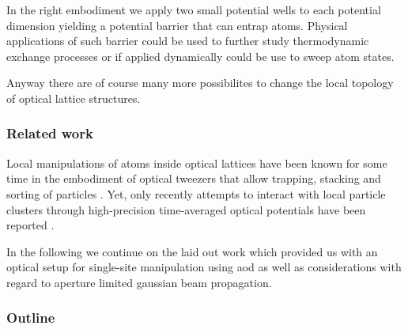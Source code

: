 In the right embodiment we apply two small potential wells to each potential
dimension yielding a potential barrier that can entrap atoms. Physical
applications of such barrier could be used to further study thermodynamic
exchange processes or if applied dynamically could be use to sweep atom
states.

Anyway there are of course many more possibilites to change the local
topology of optical lattice structures.

\subsubsection{Related work}

Local manipulations of atoms inside optical lattices have been known for some
time in the embodiment of optical tweezers that allow trapping, stacking and
sorting of particles \cite{Tadmor2004}. Yet, only recently attempts to
interact with local particle clusters through high-precision time-averaged
optical potentials have been reported \cite{Roy2016}.

In the following we continue on the laid out work \cite{Hertlein2017} which
provided us with an optical setup for single-site manipulation using
\gls{aod} as well as considerations with regard to aperture limited
gaussian beam propagation.

\subsubsection{Outline}
